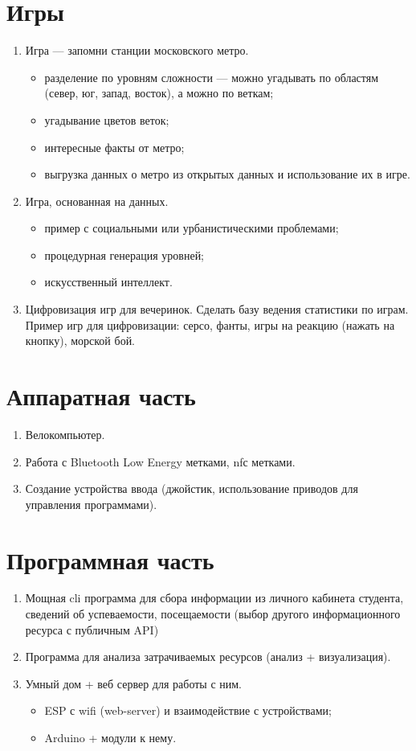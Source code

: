 \documentclass[a4paper,12pt]{article} %
\begin{document}
\section*{Игры}
\begin{enumerate}
	\item Игра --- запомни станции московского метро.
	\begin{itemize}
		\item разделение по уровням сложности --- можно угадывать по областям (север, юг, запад, восток), а можно по веткам;
		\item угадывание цветов веток;
		\item интересные факты от метро;
		\item выгрузка данных о метро из открытых данных и использование их в игре.
	\end{itemize}
	\item Игра, основанная на данных.
	\begin{itemize}
		\item пример с социальными или урбанистическими проблемами;
		\item процедурная генерация уровней;
		\item искусственный интеллект.
	\end{itemize}
	\item Цифровизация игр для вечеринок. Сделать базу ведения статистики по играм. Пример игр для цифровизации: серсо, фанты, игры на реакцию (нажать на кнопку), морской бой.
\end{enumerate}

\section*{Аппаратная часть}
\begin{enumerate}
	\item Велокомпьютер.
	\item Работа с Bluetooth Low Energy метками, nfс метками.
	\item Создание устройства ввода (джойстик, использование приводов для управления программами). 
\end{enumerate}


\section*{Программная часть}
\begin{enumerate}
	\item Мощная cli программа для сбора информации из личного кабинета студента, сведений об успеваемости, посещаемости (выбор другого информационного ресурса с публичным API)
	\item Программа для анализа затрачиваемых ресурсов (анализ + визуализация).
	\item Умный дом + веб сервер для работы с ним.
		\begin{itemize}
			\item ESP с wifi (web-server) и взаимодействие с устройствами;
			\item Arduino + модули к нему.
		\end{itemize}
\end{enumerate}
\end{document}
